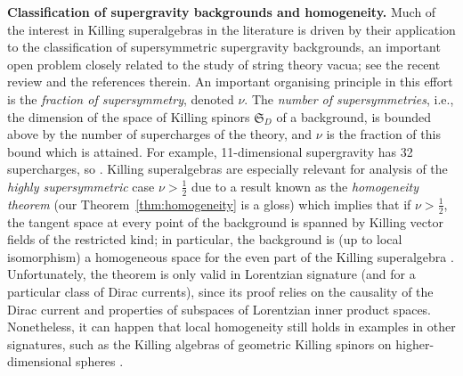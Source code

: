 \documentclass[pdftex]{sigma}
\numberwithin{equation}{section}
\newcommand{\fS}{\mathfrak{S}}
\newcommand{\1}{\mathbbm{1}}
\begin{document}
{\bf Classification of supergravity backgrounds and homogeneity.}
Much of the interest in Killing superalgebras in the literature is driven by their application to the classification of supersymmetric supergravity backgrounds, an important open problem closely related to the study of string theory vacua; see the recent review \cite{Gran2019} and the references therein. An important organising principle in this effort is the \emph{fraction of supersymmetry}, denoted $\nu$. The \emph{number of supersymmetries}, i.e., the dimension of the space of Killing spinors $\fS_D$ of a background, is bounded above by the number of supercharges of the theory, and $\nu$ is the fraction of this bound which is attained. For example, 11-dimensional supergravity has 32 supercharges, so \smash{$\nu=\frac{\dim\fS_D}{32}$}. Killing superalgebras are especially relevant for analysis of the \emph{highly supersymmetric} case $\nu>\frac{1}{2}$ due to a result known as the \emph{homogeneity theorem} (our Theorem~\ref{thm:homogeneity} is a gloss) which implies that if $\nu>\frac{1}{2}$, the tangent space at every point of the background is spanned by Killing vector fields of the restricted kind; in particular, the background is (up to local isomorphism) a homogeneous space for the even part of the Killing superalgebra \cite{Figueroa-OFarrill2012,Figueroa-OFarrill2014,Hustler2016}. Unfortunately, the theorem is only valid in Lorentzian signature (and for a particular class of Dirac currents), since its proof relies on the causality of the Dirac current and properties of subspaces of Lorentzian inner product spaces. Nonetheless, it can happen that local homogeneity still holds in examples in other signatures, such as the Killing algebras of geometric Killing spinors on higher-dimensional spheres \cite{Figueroa-OFarrill2008_except}.
\end{document}
